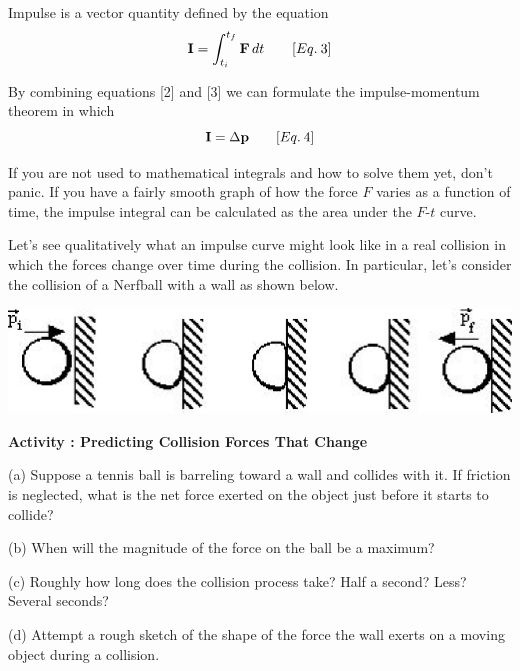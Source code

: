 Impulse is a vector quantity defined by the equation
\[
{\bf I}=\int_{t_{i}}^{t_{f}}{\bf F}\,dt\qquad [Eq.\: 3]\]


By combining equations {[}2{]} and {[}3{]} we can formulate the impulse-momentum
theorem in which
\[
{\bf I}=\Delta {\bf p}\qquad [Eq.\: 4]\]


If you are not used to mathematical integrals and how to solve them yet, don't
panic. If you have a fairly smooth graph of how the force $F$ varies as a function
of time, the impulse integral can be calculated as the area under the $F$-$t$ 
curve.

Let's see qualitatively what an impulse curve might look like in a real collision
in which the forces change over time during the collision. In particular, let's
consider the collision of a Nerfball with a wall as shown below.

\vspace{0.3cm}
{\par\centering \includegraphics{impulse/impulse_fig1.eps} \par}
\vspace{0.3cm}

\textbf{Activity  : Predicting Collision Forces That Change }

(a) Suppose a tennis ball is barreling toward a wall and collides with it. If friction is neglected, what is the net force exerted on the object just before it starts to collide?
\vspace{10mm}

(b) When will the magnitude of the force on the ball be a maximum? 
\vspace{10mm}

(c) Roughly how long does the collision process take? Half a second? Less? Several
seconds?
\vspace{10mm}

(d) Attempt a rough sketch of the shape of the force the wall exerts on a moving
object during a collision.

